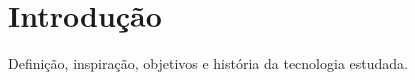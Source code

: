\section{Introdução}\label{sec:int}
Definição, inspiração, objetivos e história da tecnologia estudada. \cite{author2010}